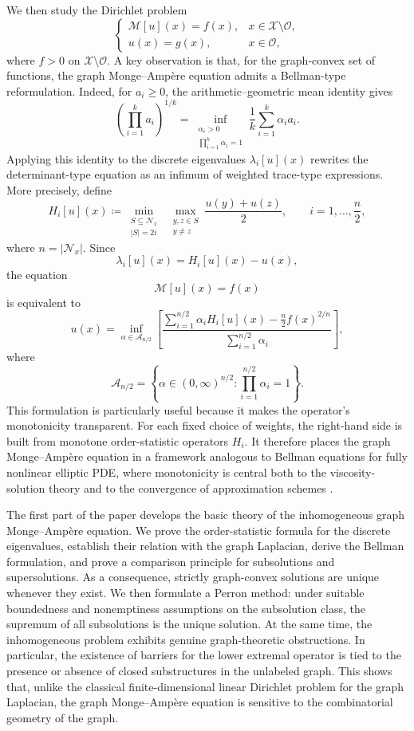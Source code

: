 \documentclass[reqno,11pt]{amsart}
\numberwithin{equation}{section}
\theoremstyle{definition}
\theoremstyle{remark}
\begin{document}
We then study the Dirichlet problem
\[
\begin{cases}
    \mathcal M [u](x)=f(x), & x\in \mathcal X\setminus \mathcal O,\\
    u(x)=g(x), & x\in \mathcal O,
\end{cases}
\]
where \(f>0\) on \(\mathcal X\setminus \mathcal O\). A key observation is that, for the graph-convex set of functions, the graph Monge--Amp\`ere equation admits a Bellman-type reformulation. Indeed, for \(a_i\geq 0\), the arithmetic--geometric mean identity gives
\[
    \left(\prod_{i=1}^k a_i\right)^{1/k}
    =
    \inf_{\substack{\alpha_i>0 \\ \prod_{i=1}^k\alpha_i=1}}
    \frac1k\sum_{i=1}^k\alpha_i a_i .
\]
Applying this identity to the discrete eigenvalues \(\lambda_i[u](x)\) rewrites the deter\-minant-type equation as an infimum of weighted trace-type expressions. More precisely, define
\[
    H_i[u](x)
    \coloneqq
    \min_{\substack{S\subseteq \mathcal N_x\\ |S|=2i}}\;
    \max_{\substack{y,z\in S\\ y\neq z}}
    \frac{u(y)+u(z)}{2},
    \qquad i=1,\dots,\frac n2,
\]
where \(n=|\mathcal N_x|\). Since
\[
    \lambda_i[u](x)=H_i[u](x)-u(x),
\]
the equation $$\mathcal M [u](x)=f(x) $$ is equivalent to
\[
    u(x)
    =
    \inf_{\alpha\in\mathcal A_{n/2}}
    \left[
        \frac{
            \sum_{i=1}^{n/2}\alpha_i H_i[u](x)
            -\frac n2 f(x)^{2/n}
        }{
            \sum_{i=1}^{n/2}\alpha_i
        }
    \right],
\]
where
\[
    \mathcal A_{n/2}
    =
    \left\{
        \alpha\in(0,\infty)^{n/2}:
        \prod_{i=1}^{n/2}\alpha_i=1
    \right\}.
\]
This formulation is particularly useful because it makes the operator's monotonicity transparent. For each fixed choice of weights, the right-hand side is built from monotone order-statistic operators \(H_i\). It therefore places the graph Monge--Amp\`ere equation in a framework analogous to Bellman equations for fully nonlinear elliptic PDE, where monotonicity is central both to the viscosity-solution theory and to the convergence of approximation schemes \cite{CrandallIshiiLions1992, BarlesSouganidis1991}.

The first part of the paper develops the basic theory of the inhomogeneous graph Monge--Amp\`ere equation. We prove the order-statistic formula for the discrete eigenvalues, establish their relation with the graph Laplacian, derive the Bellman formulation, and prove a comparison principle for subsolutions and supersolutions. As a consequence, strictly graph-convex solutions are unique whenever they exist. We then formulate a Perron method: under suitable boundedness and nonemptiness assumptions on the subsolution class, the supremum of all subsolutions is the unique solution. At the same time, the inhomogeneous problem exhibits genuine graph-theoretic obstructions. In particular, the existence of barriers for the lower extremal operator is tied to the presence or absence of closed substructures in the unlabeled graph. This shows that, unlike the classical finite-dimensional linear Dirichlet problem for the graph Laplacian, the graph Monge--Amp\`ere equation is sensitive to the combinatorial geometry of the graph.
\end{document}
